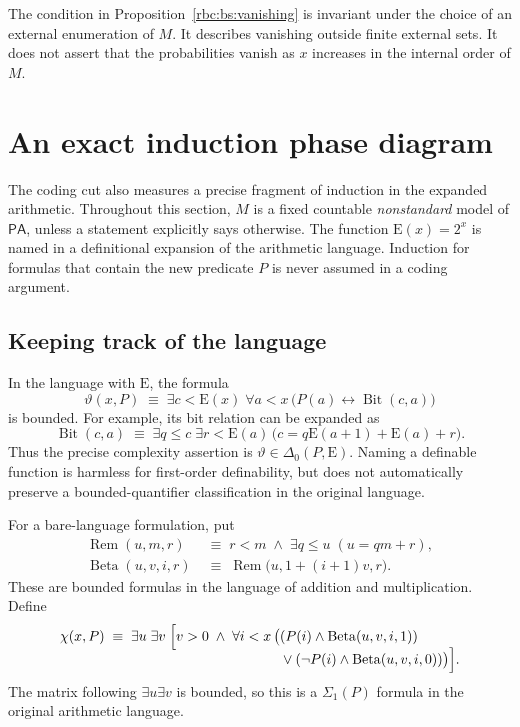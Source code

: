 \documentclass[11pt]{article}
\numberwithin{equation}{section}
\theoremstyle{definition}
\theoremstyle{remark}
\newcommand{\PA}{\mathsf{PA}}
\newcommand{\E}{\mathrm E}
\newcommand{\Bit}{\operatorname{Bit}}
\begin{document}
The condition in Proposition~\ref{rbc:bs:vanishing} is invariant under the
choice of an external enumeration of $M$.  It describes vanishing outside
finite external sets.  It does not assert that the probabilities vanish
as $x$ increases in the internal order of $M$.



\section{An exact induction phase diagram}
\label{rbc:sec:induction}

The coding cut also measures a precise fragment of induction in the
expanded arithmetic.  Throughout this section, $M$ is a fixed countable
\emph{nonstandard} model of $\PA$, unless a statement explicitly says
otherwise.  The function $\E(x)=2^x$ is named in a definitional expansion
of the arithmetic language.  Induction for formulas that contain the new
predicate $P$ is never assumed in a coding argument.

\subsection{Keeping track of the language}

In the language with $\E$, the formula
\begin{equation}
  \vartheta(x,P)\;\equiv\;
  \exists c<\E(x)\;\forall a<x\,
       \bigl(P(a)\leftrightarrow\Bit(c,a)\bigr)
  \label{rbc:eq:induction-theta}
\end{equation}
is bounded.  For example, its bit relation can be expanded as
\begin{equation}
 \Bit(c,a)\;\equiv\;
 \exists q\le c\;\exists r<\E(a)\,
       \bigl(c=q\E(a+1)+\E(a)+r\bigr).
 \label{rbc:eq:induction-bit}
\end{equation}
Thus the precise complexity assertion is
$\vartheta\in\Delta_0(P,\E)$.  Naming a definable function is harmless
for first-order definability, but does not automatically preserve a
bounded-quantifier classification in the original language.

For a bare-language formulation, put
\begin{align}
 \operatorname{Rem}(u,m,r)
   &\;\equiv\;r<m\;\wedge\;
        \exists q\le u\;(u=qm+r), \label{rbc:eq:induction-rem}\\
 \operatorname{Beta}(u,v,i,r)
   &\;\equiv\;
        \operatorname{Rem}\bigl(u,1+(i+1)v,r\bigr).
        \label{rbc:eq:induction-beta}
\end{align}
These are bounded formulas in the language of addition and
multiplication.  Define
\begin{align}
 \chi(x,P)\;\equiv\;\exists u\;\exists v\;
 \Bigl[v>0\;\wedge\;\forall i<x\,
  \bigl(& (P(i)\wedge\operatorname{Beta}(u,v,i,1))
       \label{rbc:eq:induction-chi}\\[-2mm]
       &\vee
       (\neg P(i)\wedge\operatorname{Beta}(u,v,i,0))
  \bigr)\Bigr].\nonumber
\end{align}
The matrix following $\exists u\exists v$ is bounded, so this is a
$\Sigma_1(P)$ formula in the original arithmetic language.
\end{document}
